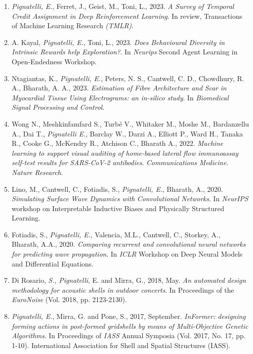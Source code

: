 \begin{publications}
    \begin{enumerate}[leftmargin=0.45cm, itemsep=0em, topsep=0.5em, parsep=0.2em]
        \item \emph{Pignatelli, E.}, Ferret, J., Geist, M., Toni, L., 2023. \textit{A Survey of Temporal Credit Assignment in Deep Reinforcement Learning}. In review, Transactions of Machine Learning Research \emph{(TMLR)}.
        \item A. Kayal, \emph{Pignatelli, E.}, Toni, L., 2023. \textit{Does Behavioural Diversity in Intrinsic Rewards help Exploration?}. In \emph{Neurips} Second Agent Learning in Open-Endedness Workshop.
        \item Ntagiantas, K., \emph{Pignatelli, E.}, Peters, N. S., Cantwell, C. D., Chowdhury, R. A., Bharath, A. A., 2023. \textit{Estimation of Fibre Architecture and Scar in Myocardial Tissue Using Electrograms: an in-silico study}. In \textit{Biomedical Signal Processing and Control}.
        \item Wong N., Meshkinfamfard S., Turbé V., Whitaker M., Moshe M., Bardanzellu A., Dai T., \emph{Pignatelli E.}, Barclay W., Darzi A., Elliott P., Ward H., Tanaka R., Cooke G., McKendry R., Atchison C., Bharath A., 2022. \textit{Machine learning to support visual auditing of home-based lateral flow immunoassay self-test results for SARS-CoV-2 antibodies}. \emph{Communications Medicine. Nature Research}.
        \item Lino, M., Cantwell, C., Fotiadis, S., \emph{Pignatelli, E.}, Bharath, A., 2020. \textit{Simulating Surface Wave Dynamics with Convolutional Networks}. In \emph{NeurIPS} workshop on Interpretable Inductive Biases and Physically Structured Learning.
        \item Fotiadis, S., \emph{Pignatelli, E.}, Valencia, M.L., Cantwell, C., Storkey, A., Bharath, A.A., 2020. \textit{Comparing recurrent and convolutional neural networks for predicting wave propagation}. In \emph{ICLR} Workshop on Deep Neural Models and Differential Equations.
        \item Di Rosario, \emph{S., Pignatelli}, E. and Mirra, G., 2018, May. \textit{An automated design methodology for acoustic shells in outdoor concerts}. In Proceedings of the \emph{EuroNoise} (Vol. 2018, pp. 2123-2130).
        \item \emph{Pignatelli, E.}, Mirra, G. and Pone, S., 2017, September. \textit{InFormer: designing forming actions in post-formed gridshells by means of Multi-Objective Genetic Algorithms}. In Proceedings of \emph{IASS} Annual Symposia (Vol. 2017, No. 17, pp. 1-10). International Association for Shell and Spatial Structures (IASS).

\end{enumerate}
\end{publications}
